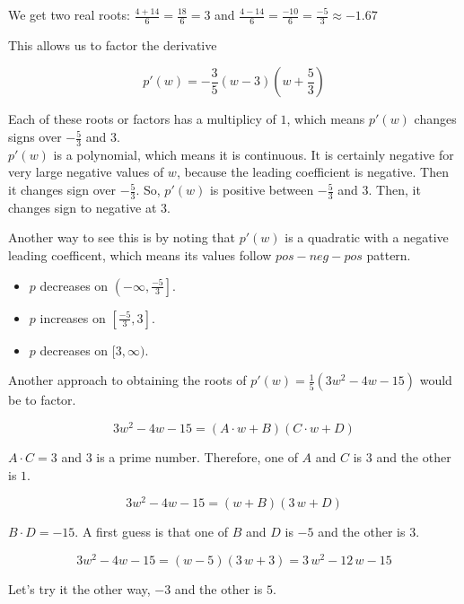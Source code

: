 \documentclass{ximera}
\begin{document}
We get two real roots: $\frac{4 + 14}{6} = \frac{18}{6} = 3$  and $\frac{4 - 14}{6} = \frac{-10}{6} = \frac{-5}{3} \approx -1.67$




This allows us to factor the derivative

\[
p'(w) = -\frac{3}{5}(w - 3) \left( w + \frac{5}{3} \right)
\]

Each of these roots or factors has a multiplicy of $1$, which means $p'(w)$ changes signs over $-\frac{5}{3}$ and $3$. \\


$p'(w)$ is a polynomial, which means it is continuous. It is certainly negative for very large negative values of $w$, because the leading coefficient is negative.  Then it changes sign over $-\frac{5}{3}$.  So, $p'(w)$ is positive between $-\frac{5}{3}$ and $3$.  Then, it changes sign to negative at $3$.


Another way to see this is by noting that $p'(w)$ is a quadratic with a negative leading coefficent, which means its values follow $pos - neg - pos$ pattern.


\begin{itemize}
\item $p$ decreases on $\left(-\infty, \frac{-5}{3}\right]$.
\item $p$ increases on $\left[\frac{-5}{3}, 3\right]$.
\item $p$ decreases on $[3, \infty)$.
\end{itemize}



Another approach to obtaining the roots of $p'(w) = \frac{1}{5}(3w^2 - 4w - 15)$ would be to factor. 


\[
3w^2 - 4w - 15      = (A \cdot w + B)(C \cdot w + D) 
\]

$A \cdot C = 3$ and $3$ is a prime number.  Therefore, one of $A$ and $C$ is $3$ and the other is $1$.



\[
3w^2 - 4w - 15      = (w + B)(3 \, w + D) 
\]



$B \cdot D = -15$.  A first guess is that one of $B$ and $D$ is $-5$ and the other is $3$. 


\[
3w^2 - 4w - 15      = (w - 5)(3 \, w + 3) = 3 \, w^2 -12 \, w - 15
\]



Let's try it the other way, $-3$ and the other is $5$.
\end{document}
